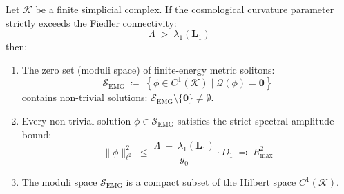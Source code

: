 \documentclass[
    12pt,
    a4paper,
    headings=normal,
    twoside=false,
    open=any,
    parskip=half
]{scrbook}
\newcommand{\moduliS}{\mathscr{S}_{\text{EMG}}}
\begin{document}
\begin{phystheorem}\label{thm:ch1_theorem_A_existence_compactness}
Let $\mathcal{K}$ be a finite simplicial complex. If the cosmological curvature parameter strictly exceeds the Fiedler connectivity:
\begin{equation}
\boxed{\Lambda \;>\; \lambda_1\left( \mathbf{L}_1 \right)}
\label{eq:ch1_fiedler_existence_condition}
\end{equation}
then:
\begin{enumerate}[label=(\alph*), noitemsep]
    \item The zero set (moduli space) of finite-energy metric solitons:
    \begin{equation}
    \moduliS \;\coloneqq\; \left\{ \phi \in C^1(\mathcal{K}) \;\big|\; \mathcal{Q}(\phi) = \mathbf{0} \right\}
    \end{equation}
    contains non-trivial solutions: $\moduliS \setminus \{\mathbf{0}\} \ne \emptyset$.
    \item Every non-trivial solution $\phi \in \moduliS$ satisfies the strict spectral amplitude bound:
    \begin{equation}
    \boxed{\|\phi\|_{\ell^2}^2 \;\le\; \frac{\Lambda \;-\; \lambda_1(\mathbf{L}_1)}{g_0} \cdot D_1 \;\eqqcolon\; R_{\max}^2}
    \label{eq:ch1_spectral_amplitude_bound_master}
    \end{equation}
    \item The moduli space $\moduliS$ is a compact subset of the Hilbert space $C^1(\mathcal{K})$.
\end{enumerate}

\end{phystheorem}
\end{document}
